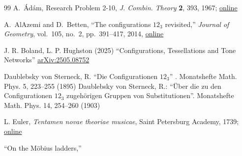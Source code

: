 \documentclass[12pt,letterpaper]{amsart}
\begin{document}
\begin{thebibliography}{99}
A.~\'{A}d\'{a}m, Research Problem 2-10, \textit{J. Combin. Theory} \textbf{2}, 393, 1967; \href{https://www.sciencedirect.com/science/article/pii/S0021980067800371/pdfft?md5=38955351dbc7b9b22b94b2a6120ef4af&pid=1-s2.0-S0021980067800371-main.pdf}{online}

  
A.~AlAzemi and D.~Betten,
``The configurations $12_3$ revisited,''
\textit{Journal of Geometry}, vol.~105, no.~2, pp.~391--417, 2014, \href{https://link.springer.com/article/10.1007/s00022-014-0228-0}{online}

  
      J. R. Boland, L. P. Hughston (2025) ``Configurations, Tessellations and Tone Networks''  \href{https://arxiv.org/abs/2505.08752}{arXiv:2505.08752}

 Daublebsky von Sterneck, R. ``Die Configurationen $12_3$'' . Monatshefte Math. Phys. 5, 223–255 (1895)
 Daublebsky von Sterneck, R.: ``\"Uber die zu den Configurationen $12_3$ zugeh\"origen Gruppen von Substitutionen''. Monatshefte Math. Phys. 14, 254–260 (1903)
      
      
L. Euler,
\textit{Tentamen novae theoriae musicae},
Saint Petersburg Academy, 1739; \href{https://scholarlycommons.pacific.edu/cgi/viewcontent.cgi?article=1032&context=euler-works}{online}

``On the Möbius ladders,'' 



\end{thebibliography}
\end{document}
